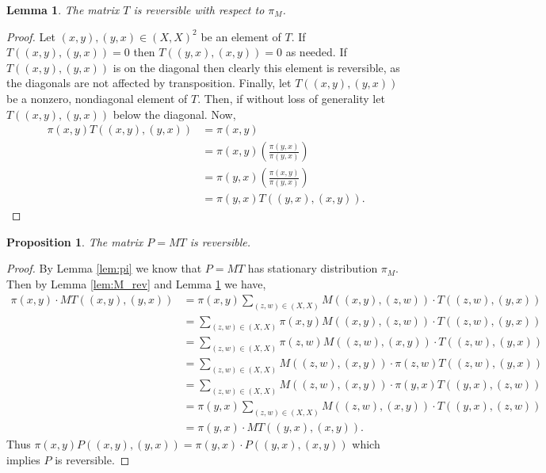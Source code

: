 \documentclass{amsart}
\newtheorem{lemma}[definition]{Lemma}
\newtheorem{proposition}[definition]{Proposition}
\newcommand{\1}{\mathbbm{1}}
\begin{document}
\begin{lemma}\label{lem:T_rev}
    The matrix $T$ is reversible with respect to $\pi_M$.
\end{lemma}
\begin{proof}
    Let $(x,y),(y,x)\in (X,X)^2$ be an element of $T$. If $T((x,y),(y,x))=0$ then $T((y,x),(x,y))=0$ as needed. If $T((x,y),(y,x))$ is on the diagonal then clearly this element is reversible, as the diagonals are not affected by transposition. Finally, let $T((x,y),(y,x))$ be a nonzero, nondiagonal element of $T$. Then, if without loss of generality let $T((x,y),(y,x))$ below the diagonal. Now, 
    \begin{align*}
        \pi(x,y)T((x,y),(y,x))&=\pi(x,y)\\
        &=\pi(x,y)\left(\frac{\pi(y,x)}{\pi(y,x)}\right)\\
        &=\pi(y,x)\left(\frac{\pi(x,y)}{\pi(y,x)}\right)\\
        &=\pi(y,x)T((y,x),(x,y)).
    \end{align*}
\end{proof}

\begin{proposition}\label{prop:P_rev}
    The matrix $P=MT$ is reversible.
\end{proposition}
\begin{proof}
    By Lemma \ref{lem:pi} we know that $P=MT$ has stationary distribution $\pi_M$. Then by Lemma \ref{lem:M_rev} and Lemma \ref{lem:T_rev} we have,
    \begin{align*}
        \pi(x,y) \cdot MT((x,y),(y,x))&=\pi(x,y) \sum_{(z,w)\in (X,X)} M((x,y),(z,w))\cdot T((z,w),(y,x))\\
        &=\sum_{(z,w)\in (X,X)} \pi(x,y)M((x,y),(z,w))\cdot T((z,w),(y,x))\\
        &=\sum_{(z,w)\in (X,X)} \pi(z,w)M((z,w),(x,y))\cdot T((z,w),(y,x))\\
        &=\sum_{(z,w)\in (X,X)} M((z,w),(x,y))\cdot \pi(z,w)T((z,w),(y,x))\\
        &=\sum_{(z,w)\in (X,X)} M((z,w),(x,y))\cdot \pi(y,x)T((y,x),(z,w))\\
        &=\pi(y,x)\sum_{(z,w)\in (X,X)} M((z,w),(x,y))\cdot T((y,x),(z,w))\\
        &=\pi(y,x) \cdot MT((y,x),(x,y)).
    \end{align*}
    Thus $\pi(x,y)P((x,y),(y,x))=\pi(y,x) \cdot P((y,x),(x,y))$ which implies $P$ is reversible. 
\end{proof}
\end{document}
